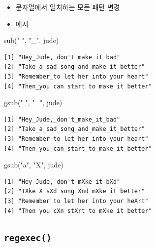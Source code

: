 \documentclass[
  11pt,
]{krantz}
\newenvironment{Shaded}{\begin{snugshade}}{\end{snugshade}}
\newcommand{\FunctionTok}[1]{\textcolor[rgb]{0,0,0}{#1}}
\newcommand{\NormalTok}[1]{#1}
\newcommand{\StringTok}[1]{\textcolor[rgb]{0.5,0.5,0.5}{#1}}
\providecommand{\tightlist}{%
  \setlength{\itemsep}{0pt}\setlength{\parskip}{0pt}}
\begin{document}
\begin{itemize}
\tightlist
\item
  문자열에서 일치하는 모든 패턴 변경
\item
  예시
\end{itemize}

\footnotesize

\begin{Shaded}
\begin{Highlighting}[]
\FunctionTok{sub}\NormalTok{(}\StringTok{" "}\NormalTok{, }\StringTok{"\_"}\NormalTok{, jude)}
\end{Highlighting}
\end{Shaded}

\begin{verbatim}
[1] "Hey_Jude, don't make it bad"         
[2] "Take_a sad song and make it better"  
[3] "Remember_to let her into your heart" 
[4] "Then_you can start to make it better"
\end{verbatim}

\begin{Shaded}
\begin{Highlighting}[]
\FunctionTok{gsub}\NormalTok{(}\StringTok{" "}\NormalTok{, }\StringTok{"\_"}\NormalTok{, jude)}
\end{Highlighting}
\end{Shaded}

\begin{verbatim}
[1] "Hey_Jude,_don't_make_it_bad"         
[2] "Take_a_sad_song_and_make_it_better"  
[3] "Remember_to_let_her_into_your_heart" 
[4] "Then_you_can_start_to_make_it_better"
\end{verbatim}

\begin{Shaded}
\begin{Highlighting}[]
\FunctionTok{gsub}\NormalTok{(}\StringTok{"a"}\NormalTok{, }\StringTok{"X"}\NormalTok{, jude)}
\end{Highlighting}
\end{Shaded}

\begin{verbatim}
[1] "Hey Jude, don't mXke it bXd"         
[2] "TXke X sXd song Xnd mXke it better"  
[3] "Remember to let her into your heXrt" 
[4] "Then you cXn stXrt to mXke it better"
\end{verbatim}

\normalsize

\hypertarget{regexec-fun}{%
\subsection{\texorpdfstring{\textbf{\texttt{regexec()}}}{regexec()}}\label{regexec-fun}}
\end{document}
